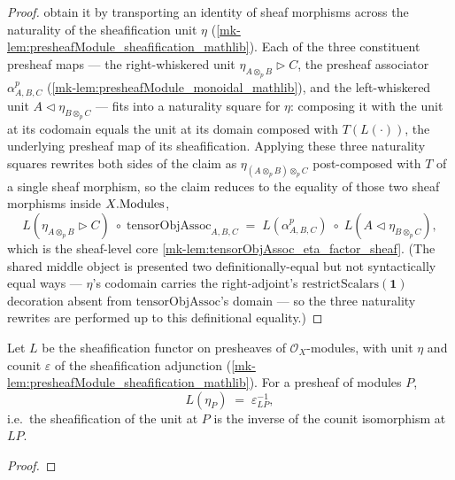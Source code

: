 \begin{proof}
  \leanok
  obtain it by transporting an identity of sheaf morphisms across the naturality of
  the sheafification unit \(\eta\) (\ref{mk-lem:presheafModule_sheafification_mathlib}).
  Each of the three constituent presheaf maps --- the right-whiskered unit
  \(\eta_{A \otimes_{p} B} \rhd C\), the presheaf associator \(\alpha^{p}_{A,B,C}\)
  (\ref{mk-lem:presheafModule_monoidal_mathlib}), and the left-whiskered unit
  \(A \lhd \eta_{B \otimes_{p} C}\) --- fits into a naturality square for \(\eta\):
  composing it with the unit at its codomain equals the unit at its domain composed
  with \(T(L(\cdot))\), the underlying presheaf map of its sheafification. Applying
  these three naturality squares rewrites both sides of the claim as
  \(\eta_{(A \otimes_{p} B) \otimes_{p} C}\) post-composed with \(T\) of a single
  sheaf morphism, so the claim reduces to the equality of those two sheaf morphisms
  inside \(X.\mathrm{Modules}\),
  \[
    L(\eta_{A \otimes_{p} B} \rhd C) \;\circ\; \mathrm{tensorObjAssoc}_{A,B,C}
      \;=\; L(\alpha^{p}_{A,B,C}) \;\circ\; L(A \lhd \eta_{B \otimes_{p} C}),
  \]
  which is the sheaf-level core \ref{mk-lem:tensorObjAssoc_eta_factor_sheaf}. (The
  shared middle object is presented two definitionally-equal but not syntactically
  equal ways --- \(\eta\)'s codomain carries the right-adjoint's
  \(\mathrm{restrictScalars}(\mathbf{1})\) decoration absent from
  \(\mathrm{tensorObjAssoc}\)'s domain --- so the three naturality rewrites are
  performed up to this definitional equality.)
\end{proof}

\begin{lemma}\label{mk-lem:sheafification_map_unit_eq}
  \leanok

  Let \(L\) be the sheafification functor on presheaves of \(\mathcal{O}_X\)-modules,
  with unit \(\eta\) and counit \(\varepsilon\) of the sheafification adjunction
  (\ref{mk-lem:presheafModule_sheafification_mathlib}). For a presheaf of modules
  \(P\),
  \[
    L(\eta_P) \;=\; \varepsilon_{L P}^{-1},
  \]
  i.e.\ the sheafification of the unit at \(P\) is the inverse of the counit
  isomorphism at \(LP\).
\end{lemma}

\begin{proof}
  \leanok\end{proof}

